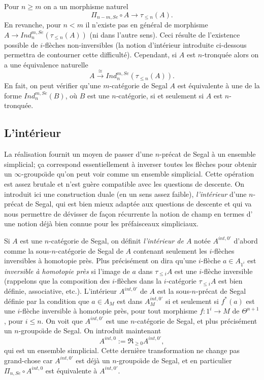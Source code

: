 \documentclass[12pt]{article}
\newcommand{\subnumero}[1]{\subsection*{#1}\phantomsection\addcontentsline{toc}{subsection}{#1}}
\begin{document}
Pour $n\geq m$ on a un morphisme naturel
$$
\Pi _{n-m, Se}\circ A\rightarrow
\tau _{\leq
n}(A).
$$
En revanche, pour $n<m$ il n'existe pas en g\'en\'eral de morphisme
$A\rightarrow Ind ^{m,Se}_n(\tau _{\leq n}(A))$ (ni dans l'autre sens). Ceci
r\'esulte de
l'existence possible de $i$-fl\`eches non-inversibles (la notion d'int\'erieur
introduite ci-dessous
permettra de contourner cette difficult\'e).  Cependant, si $A$ est
$n$-tronqu\'ee alors on a une \'equivalence naturelle
$$
A\stackrel{\cong}{\rightarrow} Ind ^{m,Se}_n(\tau _{\leq n}(A)).
$$
En fait, on peut v\'erifier qu'une $m$-cat\'egorie de
Segal $A$  est \'equivalente \`a une de la forme $Ind ^{m,Se}_n(B)$,
o\`u $B$ est une $n$-cat\'egorie, si et seulement si $A$ est $n$-tronqu\'ee.




\subnumero{L'int\'erieur}

La r\'ealisation fournit un moyen de passer d'une $n$-pr\'ecat de Segal \`a un
ensemble simplicial; \c{c}a correspond essentiellement \`a inverser toutes les
fl\`eches pour obtenir un $\infty$-groupo\"{\i}de qu'on peut voir comme un
ensemble
simplicial. Cette op\'eration est assez brutale
et n'est gu\`ere compatible
avec les questions de descente. On introduit ici une construction
duale (en un sens assez faible), {\em l'int\'erieur} d'une $n$-pr\'ecat
de Segal, qui est bien mieux adapt\'ee aux questions de descente et qui va nous
permettre
de d\'evisser de fa\c{c}on r\'ecurrente la notion de champ en termes d'
une notion d\'ej\`a bien connue pour les pr\'efaisceaux simpliciaux.

Si $A$ est une $n$-cat\'egorie de Segal, on d\'efinit {\em l'int\'erieur de $A$}
not\'ee $A^{int, 0'}$ d'abord comme la sous-$n$-cat\'egorie de Segal de $A$
contenant seulement les $i$-fl\`eches inversibles \`a homotopie pr\`es.
Plus pr\'ecis\'ement on dira qu'une $i$-fl\`eche $a\in A_{1^i}$ est {\em
inversible
\`a homotopie pr\`es} si l'image de $a$ dans $\tau _{\leq i}A$ est une
$i$-fl\`eche inversible (rappelons que la composition des $i$-fl\`eches dans la
$i$-cat\'egorie $\tau _{\leq i}A$ est bien d\'efinie, associative, etc.).
L'int\'erieur $A^{int, 0'}$ de $A$ est la sous-$n$-pr\'ecat de Segal
d\'efinie par la
condition que $a\in A_M$ est dans $A^{int,0'}_M$ si et seulement si
$f^{\ast}(a)$ est une $i$-fl\`eche inversible \`a  homotopie pr\`es, pour
tout morphisme $f: 1^i\rightarrow M$ de $\Theta ^{n+1}$, pour $i\leq n $.
On voit que $A^{int, 0'}$ est une $n$-cat\'egorie de Segal, et
plus pr\'ecis\'ement un
$n$-groupo\"{\i}de de Segal.  On introduit maintenant
$$
A^{int, 0}:= \Re _{\geq 0} A^{int, 0'},
$$
qui est un ensemble simplicial.
Cette derni\`ere transformation ne change pas grand-chose car $A^{int, 0'}$
est d\'ej\`a
un $n$-groupo\"{\i}de de Segal, et en particulier $\Pi _{n,Se}\circ A^{int,
0}$ est
\'equivalente \`a $A^{int, 0'}$.
\end{document}

